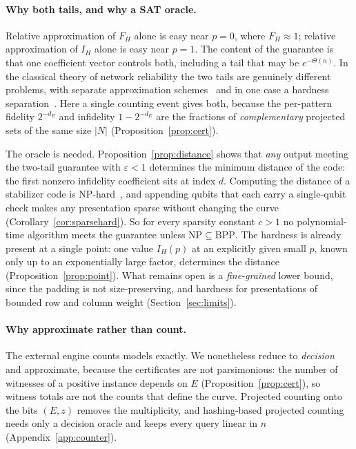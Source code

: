 \documentclass[11pt]{article}
\theoremstyle{remark}
\newcommand{\eps}{\varepsilon}
\begin{document}
\paragraph{Why both tails, and why a SAT oracle.}
Relative approximation of \(F_H\) alone is easy near \(p=0\), where
\(F_H\approx1\); relative approximation of \(I_H\) alone is easy near
\(p=1\). The content of the guarantee is that one coefficient vector
controls both, including a tail that may be \(e^{-\Theta(n)}\). In the
classical theory of network reliability the two tails are genuinely
different problems, with separate approximation
schemes~\cite{karger1999,guojerrum2019} and in one case a hardness
separation~\cite{fengguo2023,fengfuguo2026}. Here a single counting event
gives both, because the per-pattern fidelity \(2^{-d_E}\) and infidelity
\(1-2^{-d_E}\) are the fractions of \emph{complementary} projected sets
of the same size \(|N|\) (Proposition~\ref{prop:cert}).

The oracle is needed. Proposition~\ref{prop:distance} shows that
\emph{any} output meeting the two-tail guarantee with \(\eps<1\)
determines the minimum distance of the code: the first nonzero
infidelity coefficient sits at index \(d\). Computing the distance of a
stabilizer code is NP-hard~\cite{kapshikarkundu2023,vardy1997}, and
appending qubits that each carry a single-qubit check makes any
presentation sparse without changing the curve
(Corollary~\ref{cor:sparsehard}). So for every sparsity constant \(c>1\)
no polynomial-time algorithm meets the guarantee unless
\(\mathrm{NP}\subseteq\mathrm{BPP}\). The hardness is already present at
a single point: one value \(I_H(p)\) at an explicitly given small \(p\),
known only up to an exponentially large factor, determines the distance
(Proposition~\ref{prop:point}). What remains open is a
\emph{fine-grained} lower bound, since the padding is not
size-preserving, and hardness for presentations of bounded row and
column weight (Section~\ref{sec:limits}).

\paragraph{Why approximate rather than count.}
The external engine counts models exactly. We nonetheless reduce to
\emph{decision} and approximate, because the certificates are not
parsimonious: the number of witnesses of a positive instance depends on
\(E\) (Proposition~\ref{prop:cert}), so witness totals are not the
counts that define the curve. Projected counting onto the bits \((E,z)\)
removes the multiplicity, and hashing-based projected counting needs
only a decision oracle and keeps every query linear in \(n\)
(Appendix~\ref{app:counter}).
\end{document}
